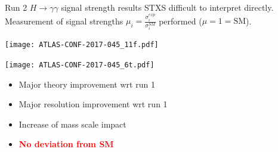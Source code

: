 \begin{frame}{Run 2 $H\rightarrow \gamma\gamma$ signal strength results}
  STXS difficult to interpret directly.\\
  Measurement of signal strengths $\mu_i = \frac{\sigma_i^{exp}}{\sigma_i^{SM}}$  performed ($\mu=1=\text{SM}$).\\

  \begin{minipage}{0.49\linewidth}
    \texttt{[image: ATLAS-CONF-2017-045\_11f.pdf]}
  \end{minipage}
  \hfill
  \begin{minipage}{0.49\linewidth}
    \centering
    \texttt{[image: ATLAS-CONF-2017-045\_6t.pdf]}
  \end{minipage}

  \begin{center}
  \begin{minipage}{0.62\linewidth}
    \begin{itemize}
    \item Major theory improvement wrt run 1
    \item Major resolution improvement wrt run 1
    \item Increase of mass scale impact
    \item   \textcolor{red}{\bf No deviation from SM}
      \end{itemize}
  \end{minipage}

  \end{center}
\end{frame}
